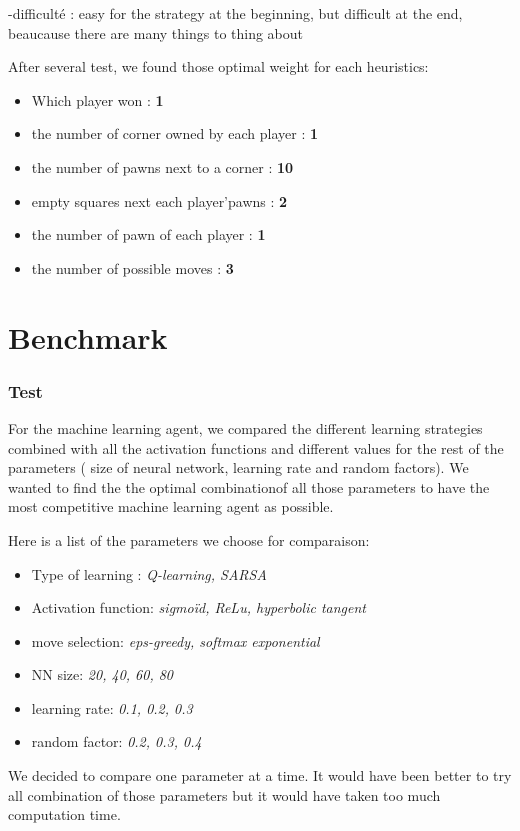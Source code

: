 \documentclass{article}
\begin{document}
-difficulté : easy for the strategy at the beginning, but difficult at the end, beaucause there are many things to thing about

 \newline
 After several test, we found those optimal weight for each heuristics:
\begin{itemize}
    \item Which player won : \textbf{1}
    \item the number of corner owned by each player : \textbf{1}
    \item the number of pawns next to a corner : \textbf{10}
    \item empty squares next each player'pawns : \textbf{2}
    \item the number of pawn of each player : \textbf{1}
    \item the number of possible moves : \textbf{3}
\end{itemize}


\section{Benchmark} \label{sec:benchmark}

\subsubsection{Test}
For the machine learning agent, we compared the different learning strategies combined with all the activation functions and different values for the rest of the parameters ( size of neural network, learning rate and random factors). We wanted to find the the optimal combinationof all those parameters to have the most competitive machine learning agent as possible.

Here is a list of the parameters we choose for comparaison:
\begin{itemize}
    \item Type of learning : \textit{ Q-learning, SARSA}
    \item Activation function: \textit{sigmoïd, ReLu, hyperbolic tangent}
    \item move selection: \textit{eps-greedy, softmax exponential}
    \item NN size: \textit{20, 40, 60, 80}
    \item learning rate: \textit{0.1, 0.2, 0.3}
    \item random factor: \textit{0.2, 0.3, 0.4}
\end{itemize}
We decided to compare one parameter at a time. It would have been better to try all combination of those parameters but it would have taken too much computation time. \\
\end{document}
